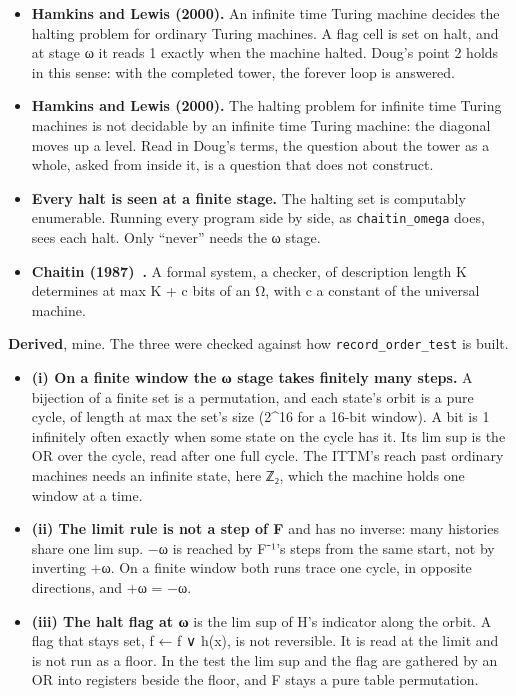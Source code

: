 \begin{itemize}
\item \textbf{Hamkins and Lewis (2000).} An infinite time Turing machine decides the halting problem for ordinary Turing machines. A flag cell is set on halt, and at stage ω it reads 1 exactly when the machine halted. Doug's point 2 holds in this sense: with the completed tower, the forever loop is answered.
\item \textbf{Hamkins and Lewis (2000).} The halting problem for infinite time Turing machines is not decidable by an infinite time Turing machine: the diagonal moves up a level. Read in Doug's terms, the question about the tower as a whole, asked from inside it, is a question that does not construct.
\item \textbf{Every halt is seen at a finite stage.} The halting set is computably enumerable. Running every program side by side, as \texttt{chaitin\_\allowbreak{}omega} does, sees each halt. Only “never” needs the ω stage.
\item \textbf{Chaitin (1987)~\cite{src:Chaitin-1987}.} A formal system, a checker, of description length K determines at max K + c bits of an Ω, with c a constant of the universal machine.
\end{itemize}

\textbf{Derived}, mine. The three were checked against how \texttt{record\_\allowbreak{}order\_\allowbreak{}test} is built.

\begin{itemize}
\item \textbf{(i) On a finite window the ω stage takes finitely many steps.} A bijection of a finite set is a permutation, and each state's orbit is a pure cycle, of length at max the set's size (2\textasciicircum{}16 for a 16-bit window). A bit is 1 infinitely often exactly when some state on the cycle has it. Its lim sup is the OR over the cycle, read after one full cycle. The ITTM's reach past ordinary machines needs an infinite state, here ℤ₂, which the machine holds one window at a time.
\item \textbf{(ii) The limit rule is not a step of F} and has no inverse: many histories share one lim sup. −ω is reached by F⁻¹'s steps from the same start, not by inverting +ω. On a finite window both runs trace one cycle, in opposite directions, and +ω = −ω.
\item \textbf{(iii) The halt flag at ω} is the lim sup of H's indicator along the orbit. A flag that stays set, f ← f ∨ h(x), is not reversible. It is read at the limit and is not run as a floor. In the test the lim sup and the flag are gathered by an OR into registers beside the floor, and F stays a pure table permutation.
\end{itemize}

